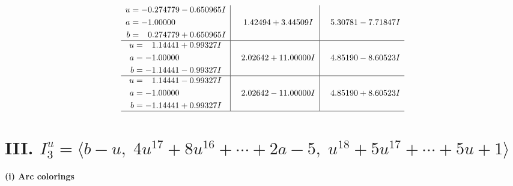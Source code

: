 \documentclass[1p]{elsarticle_modified}
\theoremstyle{definition}
\begin{document}
$$\begin{array}{c|c|c}
\begin{aligned}
u &= -0.274779 - 0.650965 I \\
a &= -1.00000\phantom{ +0.000000I} \\
b &= \phantom{-}0.274779 + 0.650965 I\end{aligned}
 & \phantom{-}1.42494 + 3.44509 I & \phantom{-}5.30781 - 7.71847 I \\ \hline\begin{aligned}
u &= \phantom{-}1.14441 + 0.99327 I \\
a &= -1.00000\phantom{ +0.000000I} \\
b &= -1.14441 - 0.99327 I\end{aligned}
 & \phantom{-}2.02642 + 11.00000 I & \phantom{-}4.85190 - 8.60523 I \\ \hline\begin{aligned}
u &= \phantom{-}1.14441 - 0.99327 I \\
a &= -1.00000\phantom{ +0.000000I} \\
b &= -1.14441 + 0.99327 I\end{aligned}
 & \phantom{-}2.02642 - 11.00000 I & \phantom{-}4.85190 + 8.60523 I\\
 \hline 
 \end{array}$$\newpage\newpage\renewcommand{\arraystretch}{1}
\centering \section*{III. $I^u_{3}= \langle b- u,\;4 u^{17}+8 u^{16}+\cdots+2 a-5,\;u^{18}+5 u^{17}+\cdots+5 u+1 \rangle$}
\flushleft \textbf{(i) Arc colorings}\\
\end{document}
